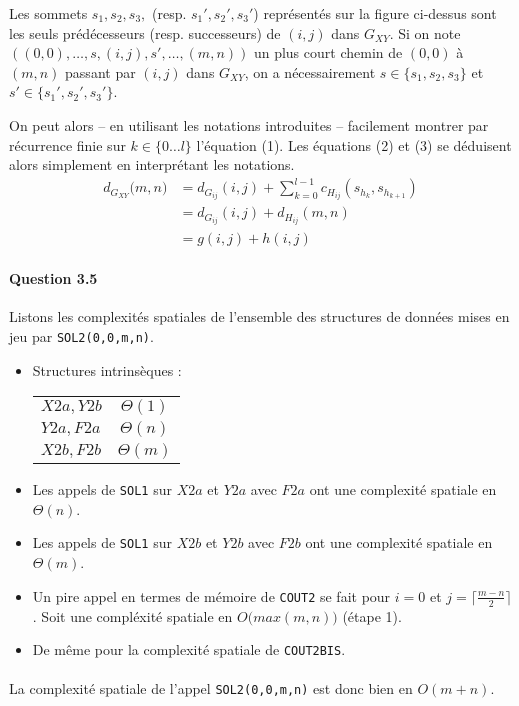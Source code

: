  

Les sommets $s_1,s_2,s_3,$ (resp. $s_1',s_2',s_3'$) repr\'esent\'es
sur la figure ci-dessus sont les seuls pr\'ed\'ecesseurs
(resp. successeurs) de $(i,j)$ dans $G_{XY}$. Si on note
$((0,0),\ldots,s,(i,j),s',\ldots,(m,n))$ un plus court chemin de
$(0,0)$ \`a $(m,n)$ passant par $(i,j)$ dans $G_{XY}$, on a
n\'ecessairement $s\in\{s_1,s_2,s_3\}$ et $s'\in\{s_1',s_2',s_3'\}$.
\nopagebreak

On peut alors -- en utilisant les notations introduites -- facilement
montrer par r\'ecurrence finie sur $k\in\{0\ldots l\}$ l'\'equation
(1). Les \'equations (2) et (3) se d\'eduisent alors simplement en
interpr\'etant les notations.
\begin{align}
  d_{G_{XY}}\big(m,n\big)
  &=d_{G_{ij}}(i,j)+\sum_{k=0}^{l-1}c_{H_{ij}}(s_{h_k},s_{h_{k+1}})\\
  &=d_{G_{ij}}(i,j)+d_{H_{ij}}(m,n)\\
  &=g(i,j)+h(i,j)
\end{align}

\paragraph{Question 3.5}
Listons les complexit\'es spatiales de l'ensemble des structures de
donn\'ees mises en jeu par \verb'SOL2(0,0,m,n)'.\\
\begin{itemize}
\item Structures intrins\`eques :
\begin{table*}[h]
  \centering
\begin{tabular}{l|c}
  $X2a,Y2b$&$\Theta(1)$\\
  $Y2a,F2a$&$\Theta(n)$\\
  $X2b,F2b$&$\Theta(m)$\\
\end{tabular}
\end{table*}
\item Les appels de \verb'SOL1' sur $X2a$ et $Y2a$ avec $F2a$ ont une
  complexit\'e spatiale en $\Theta(n)$.
\item Les appels de \verb'SOL1' sur $X2b$ et $Y2b$ avec $F2b$ ont une
  complexit\'e spatiale en $\Theta(m)$.
\item Un pire appel en termes de m\'emoire de \verb'COUT2' se fait
  pour $i=0$ et $j=\lceil\frac{m-n}{2}\rceil$. Soit une compl\'exit\'e
  spatiale en $O\big(max(m,n)\big)$ (\'etape 1).
\item De m\^eme pour la complexit\'e spatiale de \verb'COUT2BIS'.
\end{itemize}
\paragraph{}
La complexit\'e spatiale de l'appel \verb'SOL2(0,0,m,n)' est donc bien
en $O(m+n)$.
